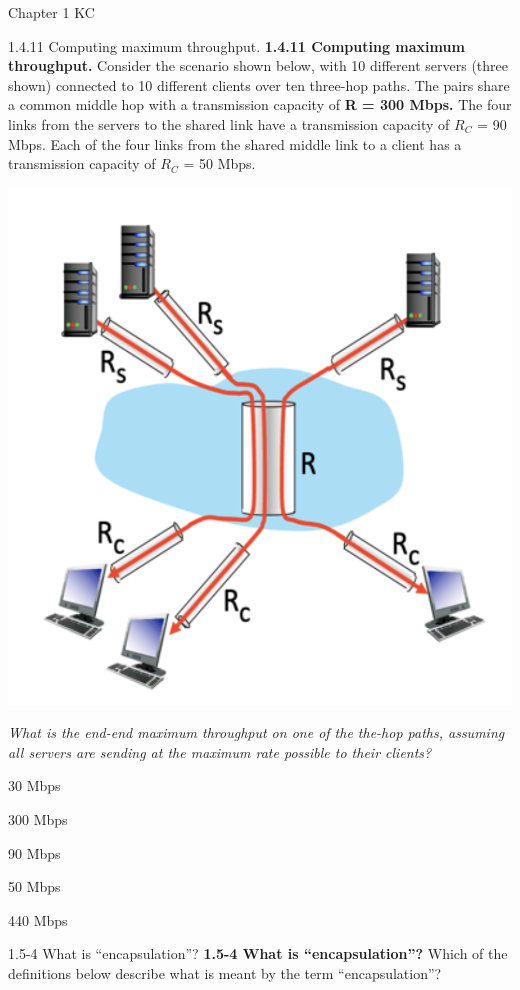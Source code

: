 \documentclass[a4paper]{article}
\begin{document}
\begin{quiz}{Chapter 1 KC}
\begin{multi}[points=1]{1.4.11 Computing maximum throughput.}
\textbf{1.4.11 Computing maximum throughput.} 
Consider the scenario shown below, with 10 different servers (three shown) connected to 10 different clients over ten three-hop paths. The pairs share a common middle hop with a transmission capacity of \textbf{R = 300 Mbps.} The four links from the servers to the shared link have a transmission capacity of $R_C$ = 90 Mbps. Each of the four links from the shared middle link to a client has a transmission capacity of $R_C$ = 50 Mbps.
\begin{center}
\includegraphics[width=\linewidth]{figs/1.4.11.png}
\end{center}

\emph{What is the end-end maximum throughput on one of the the-hop paths, assuming all servers are sending at the maximum rate possible to their clients?}
\item* 30 Mbps
\item 300 Mbps
\item 90 Mbps
\item 50 Mbps
\item 440 Mbps
\end{multi}

\begin{multi}[points=1]{1.5-4 What is ``encapsulation''?}
\textbf{1.5-4 What is ``encapsulation''?} 
Which of the definitions below describe what is meant by the term ``encapsulation''?


\end{multi}
\end{quiz}
\end{document}
